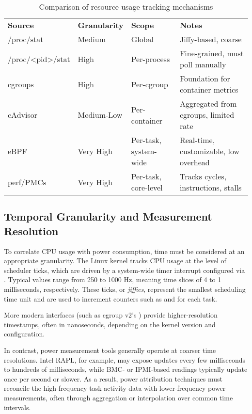 \begin{table}[H]
\centering
\begin{tabular}{| m{3.2cm} | m{2cm}| m{3.6cm} | m{4cm} |}
\hline
\textbf{Source} & \textbf{Granularity} & \textbf{Scope} & \textbf{Notes} \\
\Xhline{1.5pt}
/proc/stat & Medium & Global & Jiffy-based, coarse \\
\hline
/proc/\textless pid\textgreater/stat & High & Per-process & Fine-grained, must poll manually \\
\hline
cgroups & High & Per-cgroup & Foundation for container metrics \\
\hline
cAdvisor & Medium-Low & Per-container & Aggregated from cgroups, limited rate \\
\hline
eBPF & Very High & Per-task, system-wide & Real-time, customizable, low overhead \\
\hline
perf/PMCs & Very High & Per-task, core-level & 	Tracks cycles, instructions, stalls\\
\hline
\end{tabular}
\caption{Comparison of resource usage tracking mechanisms}
\end{table}

\subsection{Temporal Granularity and Measurement Resolution}
\label{sec:granularity}
To correlate CPU usage with power consumption, time must be considered at an appropriate granularity. The Linux kernel tracks CPU usage at the level of scheduler ticks, which are driven by a system-wide timer interrupt configured via . Typical values range from 250 to 1000 Hz, meaning time slices of 4 to 1 milliseconds, respectively. These ticks, or \emph{jiffies}, represent the smallest scheduling time unit and are used to increment counters such as  and  for each task.

More modern interfaces (such as cgroup v2’s ) provide higher-resolution timestamps, often in nanoseconds, depending on the kernel version and configuration.

In contrast, power measurement tools generally operate at coarser time resolutions. Intel RAPL, for example, may expose updates every few milliseconds to hundreds of milliseconds, while BMC- or IPMI-based readings typically update once per second or slower. As a result, power attribution techniques must reconcile the high-frequency task activity data with lower-frequency power measurements, often through aggregation or interpolation over common time intervals.

